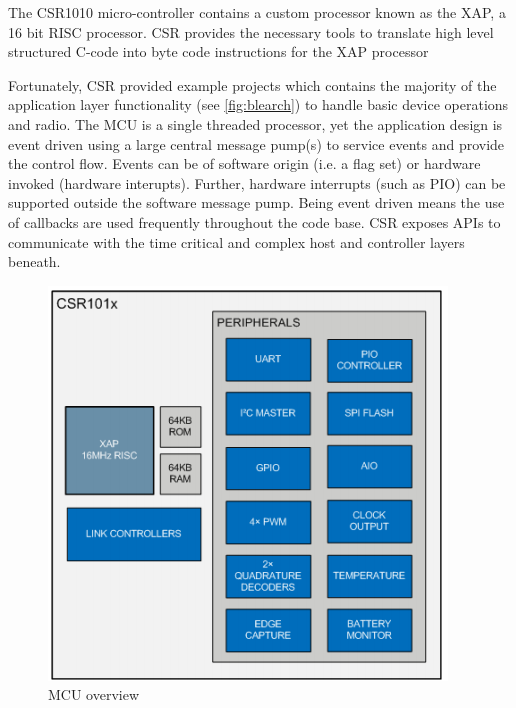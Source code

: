 \documentclass[]{article}
\begin{document}
The CSR1010 micro-controller contains a custom processor known as the XAP, a 16 bit \ac{RISC} processor. \ac{CSR} provides the necessary tools to translate high level structured C-code into byte code instructions for the XAP processor

Fortunately, \ac{CSR} provided example projects which contains the majority of the application layer functionality (see \ref{fig:blearch}) to handle basic device operations and radio. The \ac{MCU} is a single threaded processor, yet the application design is event driven using a large central message pump(s) to service events and provide the control flow. Events can be of software origin (i.e. a flag set) or hardware invoked (hardware interupts). Further, hardware interrupts (such as PIO) can be supported outside the software message pump. Being event driven means the use of callbacks are used frequently throughout the code base. \ac{CSR} exposes \ac{API}s to communicate with the time critical and complex host and controller layers beneath.


\begin{figure}[htb]
	\begin{center}
		\includegraphics{mcu}
	\end{center}
	\caption{MCU overview \cite{firmwaredev}}
	\label{fig:mcu}
\end{figure}
\end{document}
